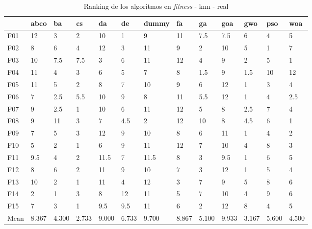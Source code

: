 \begin{table}
    \begin{adjustbox}{width=\linewidth}
        \begin{tabular}{lllllllllllll}
            \toprule
            {}   & abco  & ba    & cs    & da    & de    & dummy & fa    & ga    & goa   & gwo   & pso   & woa   \\
            \midrule
            F01  & 12    & 3     & 2     & 10    & 1     & 9     & 11    & 7.5   & 7.5   & 6     & 4     & 5     \\
            F02  & 8     & 6     & 4     & 12    & 3     & 11    & 9     & 2     & 10    & 5     & 1     & 7     \\
            F03  & 10    & 7.5   & 7.5   & 3     & 6     & 11    & 12    & 4     & 9     & 2     & 5     & 1     \\
            F04  & 11    & 4     & 3     & 6     & 5     & 7     & 8     & 1.5   & 9     & 1.5   & 10    & 12    \\
            F05  & 11    & 5     & 2     & 8     & 7     & 10    & 9     & 6     & 12    & 1     & 3     & 4     \\
            F06  & 7     & 2.5   & 5.5   & 10    & 9     & 8     & 11    & 5.5   & 12    & 1     & 4     & 2.5   \\
            F07  & 9     & 2.5   & 1     & 10    & 6     & 11    & 12    & 5     & 8     & 2.5   & 7     & 4     \\
            F08  & 9     & 11    & 3     & 7     & 4.5   & 2     & 12    & 10    & 8     & 4.5   & 6     & 1     \\
            F09  & 7     & 5     & 3     & 12    & 9     & 10    & 8     & 6     & 11    & 1     & 4     & 2     \\
            F10  & 5     & 2     & 1     & 6     & 9     & 11    & 12    & 7     & 10    & 4     & 8     & 3     \\
            F11  & 9.5   & 4     & 2     & 11.5  & 7     & 11.5  & 8     & 3     & 9.5   & 1     & 6     & 5     \\
            F12  & 8     & 6     & 2     & 11    & 9     & 10    & 7     & 3     & 12    & 1     & 5     & 4     \\
            F13  & 10    & 2     & 1     & 11    & 4     & 12    & 3     & 7     & 9     & 5     & 8     & 6     \\
            F14  & 2     & 1     & 3     & 8     & 12    & 11    & 5     & 7     & 10    & 4     & 9     & 6     \\
            F15  & 7     & 3     & 1     & 9.5   & 9.5   & 11    & 6     & 2     & 12    & 8     & 4     & 5     \\
            Mean & 8.367 & 4.300 & 2.733 & 9.000 & 6.733 & 9.700 & 8.867 & 5.100 & 9.933 & 3.167 & 5.600 & 4.500 \\
            \bottomrule
        \end{tabular}
    \end{adjustbox}
    \caption{Ranking de los algoritmos en \textit{fitness} - knn - real}
    \label{tab:ranking_fitness_real_knn}
\end{table}


